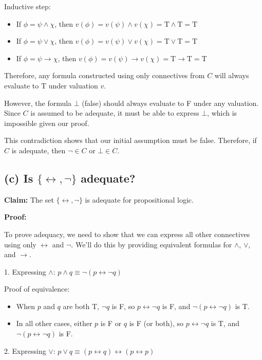 \documentclass{article}
\begin{document}
Inductive step:
\begin{itemize}
    \item If $\phi = \psi \wedge \chi$, then $v(\phi) = v(\psi) \wedge v(\chi) = \text{T} \wedge \text{T} = \text{T}$
    \item If $\phi = \psi \vee \chi$, then $v(\phi) = v(\psi) \vee v(\chi) = \text{T} \vee \text{T} = \text{T}$
    \item If $\phi = \psi \rightarrow \chi$, then $v(\phi) = v(\psi) \rightarrow v(\chi) = \text{T} \rightarrow \text{T} = \text{T}$
\end{itemize}

Therefore, any formula constructed using only connectives from $C$ will always evaluate to T under valuation $v$.

However, the formula $\bot$ (false) should always evaluate to F under any valuation. Since $C$ is assumed to be adequate, it must be able to express $\bot$, which is impossible given our proof.

This contradiction shows that our initial assumption must be false. Therefore, if $C$ is adequate, then $\neg \in C$ or $\bot \in C$.

\newpage
\subsection*{(c) Is $\{\leftrightarrow, \neg\}$ adequate?}

\textbf{Claim:} The set $\{\leftrightarrow, \neg\}$ is adequate for propositional logic.

\textbf{Proof:}

To prove adequacy, we need to show that we can express all other connectives using only $\leftrightarrow$ and $\neg$. We'll do this by providing equivalent formulas for $\wedge$, $\vee$, and $\rightarrow$.

1. Expressing $\wedge$:
   $p \wedge q \equiv \neg(p \leftrightarrow \neg q)$
   
   Proof of equivalence:
   \begin{itemize}
       \item When $p$ and $q$ are both T, $\neg q$ is F, so $p \leftrightarrow \neg q$ is F, and $\neg(p \leftrightarrow \neg q)$ is T.
       \item In all other cases, either $p$ is F or $q$ is F (or both), so $p \leftrightarrow \neg q$ is T, and $\neg(p \leftrightarrow \neg q)$ is F.
   \end{itemize}

2. Expressing $\vee$:
   $p \vee q \equiv (p \leftrightarrow q) \leftrightarrow (p \leftrightarrow p)$
   
\end{document}
